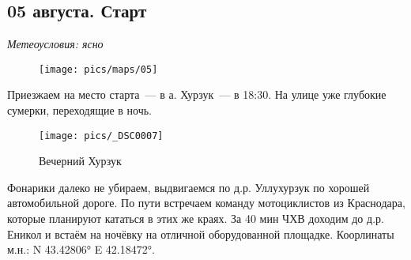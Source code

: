 \subsection{05 августа. Старт}
\textit{Метеоусловия: ясно}

\begin{figure}[h!]
	\centering
	\texttt{[image: pics/maps/05]}
	\label{fig:05}
\end{figure}

Приезжаем на место старта~--- в а. Хурзук~--- в 18:30. На улице уже глубокие сумерки, переходящие в ночь.

\begin{figure}[h!]
	\centering
	\texttt{[image: pics/\_DSC0007]}
	\caption{Вечерний Хурзук}
	\label{fig:_DSC0007}
\end{figure}

Фонарики далеко не убираем, выдвигаемся по д.р. Уллухурзук по хорошей автомобильной дороге. По пути встречаем команду мотоциклистов из Краснодара, которые планируют кататься в этих же краях. За 40 мин ЧХВ доходим до д.р. Еникол и встаём на ночёвку на отличной оборудованной площадке. Коорлинаты м.н.: N 43.42806° E 42.18472°.

\clearpage